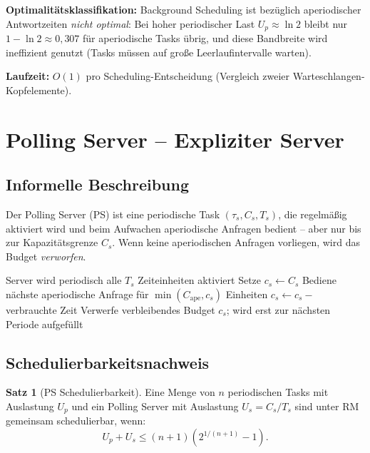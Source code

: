﻿\documentclass[a4paper,12pt]{report}
\theoremstyle{definition}
\newtheorem{satz}{Satz}[chapter]
\begin{document}
\textbf{Optimalitätsklassifikation:} Background Scheduling ist bezüglich
aperiodischer Antwortzeiten \emph{nicht optimal}: Bei hoher periodischer Last
$U_p \approx \ln 2$ bleibt nur $1 - \ln 2 \approx 0{,}307$ für aperiodische
Tasks übrig, und diese Bandbreite wird ineffizient genutzt (Tasks müssen auf
große Leerlaufintervalle warten).

\textbf{Laufzeit:} $O(1)$ pro Scheduling-Entscheidung (Vergleich zweier
Warteschlangen-Kopfelemente).

\section{Polling Server -- Expliziter Server}

\subsection{Informelle Beschreibung}

Der Polling Server (PS) ist eine periodische Task $(\tau_s, C_s, T_s)$, die
regelmäßig aktiviert wird und beim Aufwachen aperiodische Anfragen bedient
-- aber nur bis zur Kapazitätsgrenze $C_s$. Wenn keine aperiodischen Anfragen
vorliegen, wird das Budget \emph{verworfen}.

\begin{algorithm}[H]
	\caption{Polling Server}
	\begin{algorithmic}[1]
		\State Server wird periodisch alle $T_s$ Zeiteinheiten aktiviert
		\State Setze $c_s \leftarrow C_s$ 
		\State Bediene nächste aperiodische Anfrage für $\min(C_{\text{ape}}, c_s)$ Einheiten
		\State $c_s \leftarrow c_s - $ verbrauchte Zeit
		\EndWhile
		\State Verwerfe verbleibendes Budget $c_s$; wird erst zur nächsten Periode aufgefüllt
	\end{algorithmic}
\end{algorithm}

\subsection{Schedulierbarkeitsnachweis}

\begin{satz}[PS Schedulierbarkeit]
	\label{satz:ps}
	Eine Menge von $n$ periodischen Tasks mit Auslastung $U_p$ und ein Polling
	Server mit Auslastung $U_s = C_s/T_s$ sind unter RM gemeinsam schedulierbar,
	wenn:
	\[
		U_p + U_s \leq (n+1)\left(2^{1/(n+1)} - 1\right).
	\]
\end{satz}
\end{document}
